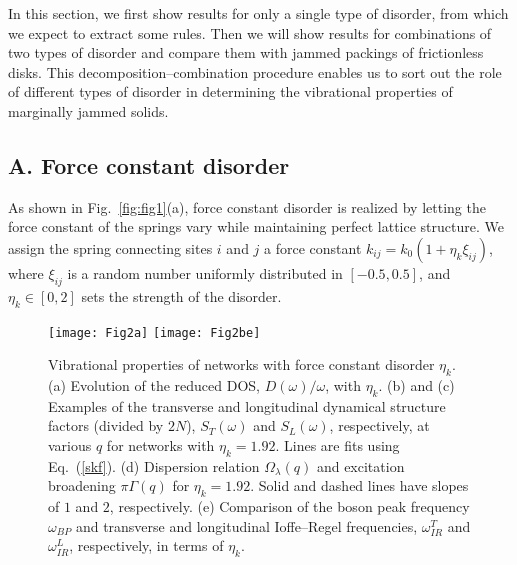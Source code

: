 \documentclass[twocolumn,printnumbers,amsmath,amssymb,prl,verbatim]{revtex4}
\begin{document}
In this section, we first show results for only a single type of disorder, from which we expect to extract some rules. Then we will show results for combinations of two types of disorder and compare them with jammed packings of frictionless disks. This decomposition--combination procedure enables us to sort out the role of different types of disorder in determining the vibrational properties of marginally jammed solids.

\subsection{A. Force constant disorder}
\label{subsec:force}

As shown in Fig.~\ref{fig:fig1}(a), force constant disorder is realized by letting the force constant of the springs vary while maintaining perfect lattice structure. We assign the spring connecting sites $i$ and $j$ a force constant $k_{ij}=k_0(1+\eta_k \xi_{ij})$, where $\xi_{ij}$ is a random number uniformly distributed in $[-0.5,0.5]$, and $\eta_k\in [0, 2]$ sets the strength of the disorder.

\begin{figure}
	\texttt{[image: Fig2a]}
	\texttt{[image: Fig2be]}	
\caption{\label{fig:fig2} Vibrational properties of networks with force constant disorder $\eta_k$. (a) Evolution of the reduced DOS, $D(\omega)/\omega$, with $\eta_k$. (b) and (c) Examples of the transverse and longitudinal dynamical structure factors (divided by $2N$), $S_{T}(\omega)$ and $S_{L}(\omega)$, respectively, at various $q$ for networks with $\eta_k=1.92$. Lines are fits using Eq.~(\ref{skf}). (d) Dispersion relation $\Omega_{\lambda}(q)$ and excitation broadening $\pi\Gamma(q)$ for $\eta_k=1.92$. Solid and dashed lines have slopes of $1$ and $2$, respectively. (e) Comparison of the boson peak frequency $\omega_{BP}$ and transverse and longitudinal Ioffe--Regel frequencies, $\omega_{IR}^T$ and $\omega_{IR}^L$, respectively, in terms of $\eta_k$.
}
\end{figure}
\end{document}
